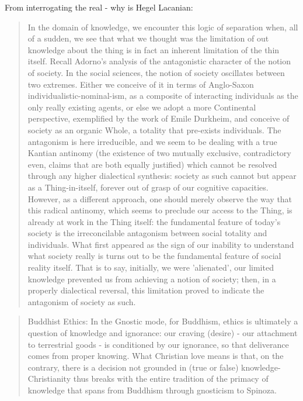 \documentclass[10pt]{book}
\begin{document}
From interrogating the real - why is Hegel Lacanian:
\begin{quotation}
In the domain of knowledge, we encounter this logic of separation when, all of a sudden, we see that what we thought was the limitation of out knowledge about the thing is in fact an inherent limitation of the thin itself. Recall Adorno's analysis of the antagonistic character of the notion of society. In the social sciences, the notion of society oscillates between two extremes. Either we conceive of it in terms of Anglo-Saxon individualistic-nominal-ism, as a composite of interacting individuals as the only really existing agents, or else we adopt a more Continental perspective, exemplified by the work of Emile Durkheim, and conceive of society as an organic Whole, a totality that pre-exists individuals. The antagonism is here irreducible, and we seem to be dealing with a true Kantian antinomy (the existence of two mutually exclusive, contradictory even, claims that are both equally justified) which cannot be resolved through any higher dialectical synthesis: society as such cannot but appear as a Thing-in-itself, forever out of grasp of our cognitive capacities. However, as a different approach, one should merely observe the way that this radical antinomy, which seems to preclude our access to the Thing, is already at work in the Thing itself: the fundamental feature of today's society is the irreconcilable antagonism between social totality and individuals. What first appeared as the sign of our inability to understand what society really is turns out to be the fundamental feature of social reality itself. That is to say, initially, we were 'alienated', our limited knowledge prevented us from achieving a notion of society; then, in a properly dialectical reversal, this limitation proved to indicate the antagonism of society as such.
\end{quotation}
\begin{quotation}
Buddhist Ethics: In the Gnostic mode, for Buddhism, ethics is ultimately a question of knowledge and ignorance: our craving (desire) - our attachment to terrestrial goods - is conditioned by our ignorance, so that deliverance comes from proper knowing. What Christian love means is that, on the contrary, there is a decision not grounded in (true or false) knowledge- Christianity thus breaks with the entire tradition of the primacy of knowledge that spans from Buddhism through gnosticism to Spinoza.
\end{quotation}
\end{document}
